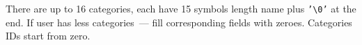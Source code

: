 \documentclass[a4paper,12pt,oneside]{scrartcl}
\begin{document}
There are up to 16 categories, each have 15 symbols length name plus
\texttt{'\textbackslash{}0'} at the end. If user has less categories~--- fill
corresponding fields with zeroes. Categories IDs start from zero.


\newpage

\printbibliography[heading=bibintoc]
\end{document}
